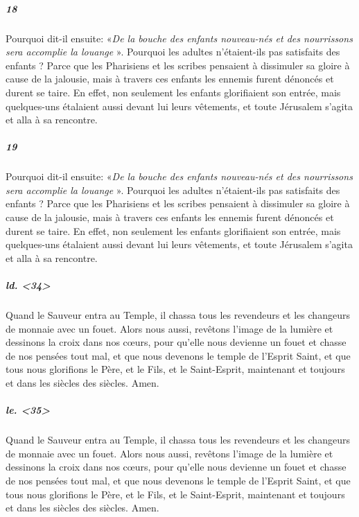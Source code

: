 \documentclass[a4paper]{article}
\begin{document}
\begin{pairs}
\begin{Leftside} 
    \beginnumbering
               \pstart
\subparagraph{18}\sloppy
Pourquoi dit-il ensuite: «\textit{De la bouche des enfants nouveau-nés et des nourrissons sera accomplie la louange}%
». Pourquoi les adultes n'étaient-ils pas satisfaits des enfants ? Parce que les Pharisiens et les scribes pensaient à dissimuler sa gloire à cause de la jalousie, mais à travers ces enfants les ennemis furent dénoncés et durent se taire. En effet, non seulement les enfants glorifiaient son entrée, mais quelques-uns étalaient aussi devant lui leurs vêtements, et toute Jérusalem s'agita et alla à sa rencontre.  
        \pend



        \pstart
\subparagraph{19}\sloppy
Pourquoi dit-il ensuite: «\textit{De la bouche des enfants nouveau-nés et des nourrissons sera accomplie la louange}%
». Pourquoi les adultes n'étaient-ils pas satisfaits des enfants ? Parce que les Pharisiens et les scribes pensaient à dissimuler sa gloire à cause de la jalousie, mais à travers ces enfants les ennemis furent dénoncés et durent se taire. En effet, non seulement les enfants glorifiaient son entrée, mais quelques-uns étalaient aussi devant lui leurs vêtements, et toute Jérusalem s'agita et alla à sa rencontre.  
        \pend

    \pausenumbering
  \end{Leftside}

\begin{Rightside} 
    \beginnumbering
      
   \pstart
\subparagraph{ld. <34>}\sloppy
Quand le Sauveur entra au Temple, il chassa tous les revendeurs et les changeurs de monnaie avec un fouet. Alors nous aussi, revêtons l'image de la lumière et dessinons la croix dans nos cœurs, pour qu'elle nous devienne un fouet et chasse de nos pensées tout mal, et que nous devenons le temple de l'Esprit Saint, et que tous nous glorifions le Père, et le Fils, et le Saint-Esprit, maintenant et toujours et dans les siècles des siècles. Amen. 
        \pend
       
        
        \pstart
        \subparagraph{le. <35>}\sloppy
Quand le Sauveur entra au Temple, il chassa tous les revendeurs et les changeurs de monnaie avec un fouet. Alors nous aussi, revêtons l'image de la lumière et dessinons la croix dans nos cœurs, pour qu'elle nous devienne un fouet et chasse de nos pensées tout mal, et que nous devenons le temple de l'Esprit Saint, et que tous nous glorifions le Père, et le Fils, et le Saint-Esprit, maintenant et toujours et dans les siècles des siècles. Amen. 
        \pend
        
\pausenumbering
\end{Rightside}
\Columns
\end{pairs}
\end{document}
